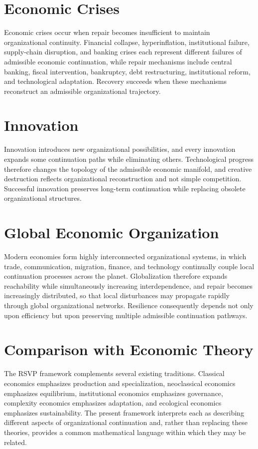 \documentclass[11pt,oneside]{book}
\numberwithin{equation}{chapter}
\theoremstyle{definition}
\theoremstyle{plain}
\begin{document}
\section{Economic Crises}

Economic crises occur when repair becomes insufficient to maintain organizational continuity. Financial collapse, hyperinflation, institutional failure, supply-chain disruption, and banking crises each represent different failures of admissible economic continuation, while repair mechanisms include central banking, fiscal intervention, bankruptcy, debt restructuring, institutional reform, and technological adaptation. Recovery succeeds when these mechanisms reconstruct an admissible organizational trajectory.

\section{Innovation}

Innovation introduces new organizational possibilities, and every innovation expands some continuation paths while eliminating others. Technological progress therefore changes the topology of the admissible economic manifold, and creative destruction reflects organizational reconstruction and not simple competition. Successful innovation preserves long-term continuation while replacing obsolete organizational structures.

\section{Global Economic Organization}

Modern economies form highly interconnected organizational systems, in which trade, communication, migration, finance, and technology continually couple local continuation processes across the planet. Globalization therefore expands reachability while simultaneously increasing interdependence, and repair becomes increasingly distributed, so that local disturbances may propagate rapidly through global organizational networks. Resilience consequently depends not only upon efficiency but upon preserving multiple admissible continuation pathways.

\section{Comparison with Economic Theory}

The RSVP framework complements several existing traditions. Classical economics emphasizes production and specialization, neoclassical economics emphasizes equilibrium, institutional economics emphasizes governance, complexity economics emphasizes adaptation, and ecological economics emphasizes sustainability. The present framework interprets each as describing different aspects of organizational continuation and, rather than replacing these theories, provides a common mathematical language within which they may be related.
\end{document}
